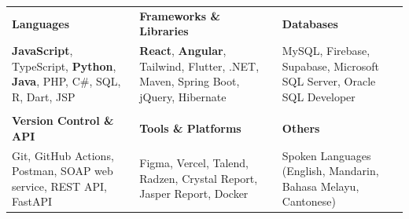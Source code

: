 \documentclass[10pt, letterpaper]{article}
\begin{document}
        \begin{center}
            \begin{tabular}{p{} p{} p{}}
            \setlength{\extrarowheight}{4pt} 
            \textbf{Languages} & \textbf{Frameworks \& Libraries} & \textbf{Databases} \\
                \textbf{JavaScript}, TypeScript, \textbf{Python}, \textbf{Java}, PHP, C\#, SQL, R, Dart, JSP &
                \textbf{React}, \textbf{Angular}, Tailwind, Flutter, .NET, Maven, Spring Boot, jQuery, Hibernate &
                MySQL, Firebase, Supabase, Microsoft SQL Server, Oracle SQL Developer \\
            
            \\
            
            \textbf{Version Control \& API} & \textbf{Tools \& Platforms} & \textbf{Others} \\
                Git, GitHub Actions, Postman, SOAP web service, REST API, FastAPI &
                Figma, Vercel, Talend, Radzen, Crystal Report, Jasper Report, Docker &
                Spoken Languages (English, Mandarin, Bahasa Melayu, Cantonese) \\
            
            \end{tabular}
        \end{center}

    \vspace{0.20 cm}
    
\end{document}

